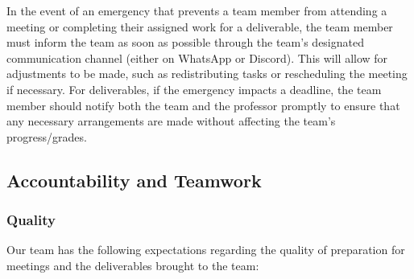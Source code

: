 \documentclass{article}
\begin{document}
In the event of an emergency that prevents a team member from attending a meeting or completing 
their assigned work for a deliverable, the team member must inform the team as soon as possible 
through the team's designated communication channel (either on WhatsApp or Discord). This will 
allow for adjustments to be made, such as redistributing tasks or rescheduling the meeting if 
necessary. For deliverables, if the emergency impacts a deadline, the team member should notify 
both the team and the professor promptly to ensure that any necessary arrangements are made 
without affecting the team's progress/grades.

\subsection*{Accountability and Teamwork}

\subsubsection*{\color{blue}Quality}

Our team has the following expectations regarding the quality of preparation for meetings and the deliverables brought to the team:
\end{document}

